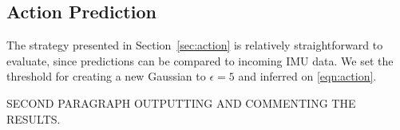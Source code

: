 \subsection{Action Prediction}
The strategy presented in Section~\ref{sec:action} is relatively straightforward
to evaluate, since predictions can be compared to incoming IMU data. We set the
threshold for creating a new Gaussian to $\epsilon=5$ and inferred on
\eqref{eqn:action}.

SECOND PARAGRAPH OUTPUTTING AND COMMENTING THE RESULTS.
